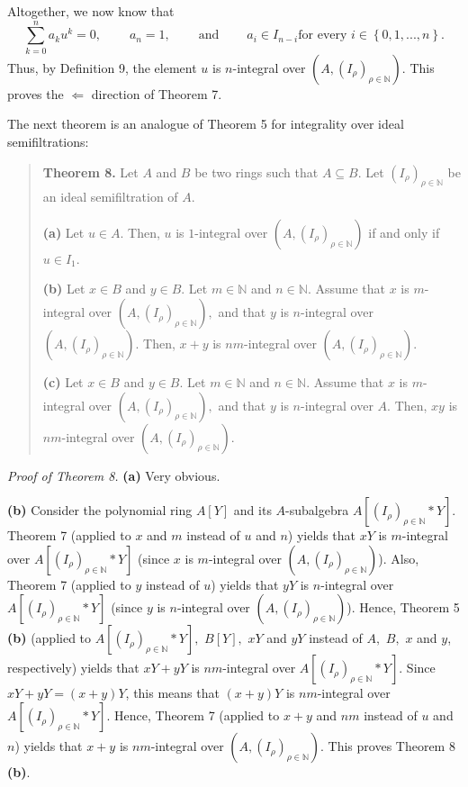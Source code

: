 \documentclass[12pt,final,notitlepage,onecolumn]{article}%
\begin{document}
Altogether, we now know that%
\[
\sum\limits_{k=0}^{n}a_{k}u^{k}=0,\ \ \ \ \ \ \ \ \ \ a_{n}%
=1,\ \ \ \ \ \ \ \ \ \ \text{and}\ \ \ \ \ \ \ \ \ \ a_{i}\in I_{n-i}\text{
for every }i\in\left\{  0,1,...,n\right\}  .
\]
Thus, by Definition 9, the element $u$ is $n$-integral over $\left(  A,\left(
I_{\rho}\right)  _{\rho\in\mathbb{N}}\right)  $. This proves the
$\Longleftarrow$ direction of Theorem 7.

The next theorem is an analogue of Theorem 5 for integrality over ideal semifiltrations:

\begin{quote}
\textbf{Theorem 8.} Let $A$ and $B$ be two rings such that $A\subseteq B$. Let
$\left(  I_{\rho}\right)  _{\rho\in\mathbb{N}}$ be an ideal semifiltration of
$A$.

\textbf{(a)} Let $u\in A$. Then, $u$ is $1$-integral over $\left(  A,\left(
I_{\rho}\right)  _{\rho\in\mathbb{N}}\right)  $ if and only if $u\in I_{1}$.

\textbf{(b)} Let $x\in B$ and $y\in B$. Let $m\in\mathbb{N}$ and
$n\in\mathbb{N}$. Assume that $x$ is $m$-integral over $\left(  A,\left(
I_{\rho}\right)  _{\rho\in\mathbb{N}}\right)  ,$ and that $y$ is $n$-integral
over $\left(  A,\left(  I_{\rho}\right)  _{\rho\in\mathbb{N}}\right)  $. Then,
$x+y$ is $nm$-integral over $\left(  A,\left(  I_{\rho}\right)  _{\rho
\in\mathbb{N}}\right)  $.

\textbf{(c)} Let $x\in B$ and $y\in B$. Let $m\in\mathbb{N}$ and
$n\in\mathbb{N}$. Assume that $x$ is $m$-integral over $\left(  A,\left(
I_{\rho}\right)  _{\rho\in\mathbb{N}}\right)  ,$ and that $y$ is $n$-integral
over $A$. Then, $xy$ is $nm$-integral over $\left(  A,\left(  I_{\rho}\right)
_{\rho\in\mathbb{N}}\right)  $.
\end{quote}

\textit{Proof of Theorem 8.} \textbf{(a)} Very obvious.

\textbf{(b)} Consider the polynomial ring $A\left[  Y\right]  $ and its
$A$-subalgebra $A\left[  \left(  I_{\rho}\right)  _{\rho\in\mathbb{N}}\ast
Y\right]  $. Theorem 7 (applied to $x$ and $m$ instead of $u$ and $n$) yields
that $xY$ is $m$-integral over $A\left[  \left(  I_{\rho}\right)  _{\rho
\in\mathbb{N}}\ast Y\right]  $ (since $x$ is $m$-integral over $\left(
A,\left(  I_{\rho}\right)  _{\rho\in\mathbb{N}}\right)  $). Also, Theorem 7
(applied to $y$ instead of $u$) yields that $yY$ is $n$-integral over
$A\left[  \left(  I_{\rho}\right)  _{\rho\in\mathbb{N}}\ast Y\right]  $ (since
$y$ is $n$-integral over $\left(  A,\left(  I_{\rho}\right)  _{\rho
\in\mathbb{N}}\right)  $). Hence, Theorem 5 \textbf{(b)} (applied to $A\left[
\left(  I_{\rho}\right)  _{\rho\in\mathbb{N}}\ast Y\right]  ,$ $B\left[
Y\right]  ,$ $xY$ and $yY$ instead of $A,$ $B,$ $x$ and $y$, respectively)
yields that $xY+yY$ is $nm$-integral over $A\left[  \left(  I_{\rho}\right)
_{\rho\in\mathbb{N}}\ast Y\right]  $. Since $xY+yY=\left(  x+y\right)  Y$,
this means that $\left(  x+y\right)  Y$ is $nm$-integral over $A\left[
\left(  I_{\rho}\right)  _{\rho\in\mathbb{N}}\ast Y\right]  $. Hence, Theorem
7 (applied to $x+y$ and $nm$ instead of $u$ and $n$) yields that $x+y$ is
$nm$-integral over $\left(  A,\left(  I_{\rho}\right)  _{\rho\in\mathbb{N}%
}\right)  $. This proves Theorem 8 \textbf{(b)}.
\end{document}
